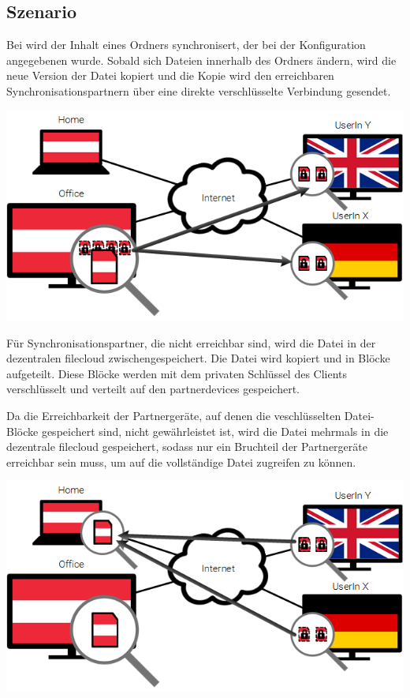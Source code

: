 \subsection{Szenario}
Bei \sblit wird der Inhalt eines Ordners synchronisert, der bei der
Konfiguration angegebenen wurde. Sobald sich Dateien innerhalb des Ordners
ändern, wird die neue Version der Datei kopiert und die Kopie wird den
erreichbaren Synchronisationspartnern über eine direkte verschlüsselte Verbindung
gesendet.

\includegraphics[]{images/sblit_1}

Für Synchronisationspartner, die nicht erreichbar sind, wird die Datei in der dezentralen
\gls{filecloud} zwischengespeichert. Die Datei wird kopiert und in Blöcke
aufgeteilt. Diese Blöcke werden mit dem privaten Schlüssel des Clients
verschlüsselt und verteilt auf den \glspl{partnerdevice} gespeichert.

Da die Erreichbarkeit der Partnergeräte, auf denen die veschlüsselten
Datei-Blöcke gespeichert sind, nicht gewährleistet ist, wird die Datei mehrmals
in die dezentrale \gls{filecloud} gespeichert, sodass nur ein Bruchteil der
Partnergeräte erreichbar sein muss, um auf die vollständige Datei zugreifen zu
können.

\includegraphics[]{images/sblit_2}

